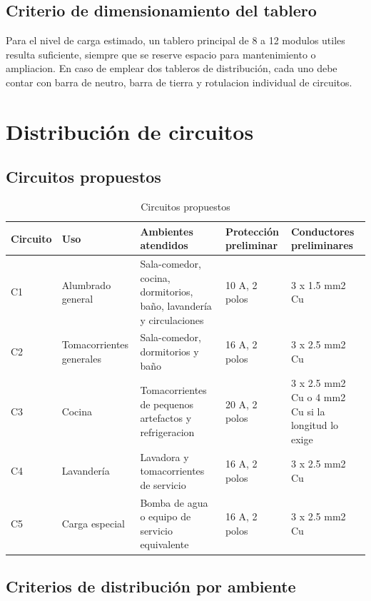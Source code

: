 \subsection{Criterio de dimensionamiento del tablero}

Para el nivel de carga estimado, un tablero principal de 8 a 12 modulos utiles resulta suficiente, siempre que se reserve espacio para mantenimiento o ampliacion. En caso de emplear dos tableros de distribución, cada uno debe contar con barra de neutro, barra de tierra y rotulacion individual de circuitos.

\section{Distribución de circuitos}

\subsection{Circuitos propuestos}

\begin{table}[H]
\centering
\small
\caption{Circuitos propuestos}
\label{tab:circuitos-propuestos}
\begin{tabularx}{\textwidth}{L{1.6cm}L{2.7cm}L{3.2cm}L{3.2cm}Y}
\toprule
\textbf{Circuito} & \textbf{Uso} & \textbf{Ambientes atendidos} & \textbf{Protección preliminar} & \textbf{Conductores preliminares} \\
\midrule
C1 & Alumbrado general & Sala-comedor, cocina, dormitorios, baño, lavandería y circulaciones & 10 A, 2 polos & 3 x 1.5 mm2 Cu \\
C2 & Tomacorrientes generales & Sala-comedor, dormitorios y baño & 16 A, 2 polos & 3 x 2.5 mm2 Cu \\
C3 & Cocina & Tomacorrientes de pequenos artefactos y refrigeracion & 20 A, 2 polos & 3 x 2.5 mm2 Cu o 4 mm2 Cu si la longitud lo exige \\
C4 & Lavandería & Lavadora y tomacorrientes de servicio & 16 A, 2 polos & 3 x 2.5 mm2 Cu \\
C5 & Carga especial & Bomba de agua o equipo de servicio equivalente & 16 A, 2 polos & 3 x 2.5 mm2 Cu \\
\bottomrule
\end{tabularx}
\end{table}

\subsection{Criterios de distribución por ambiente}

